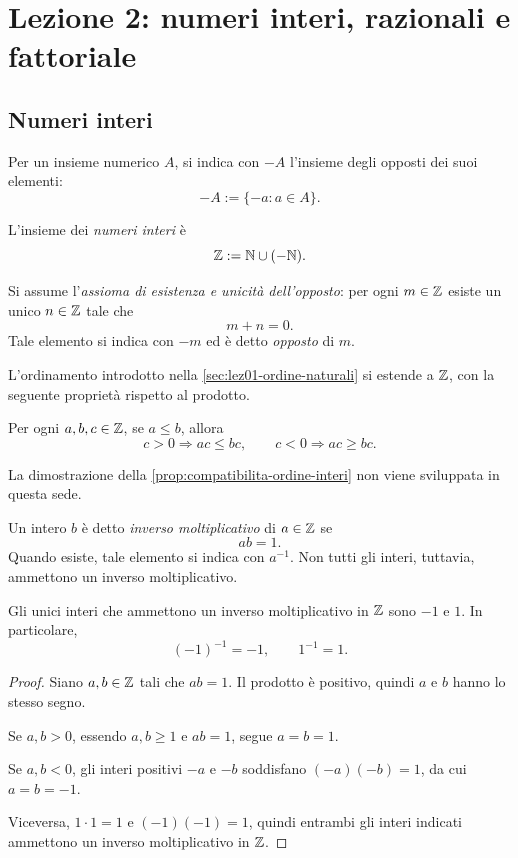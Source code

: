 \chapter[Lezione 2 --- 30 settembre 2026]{Lezione 2: numeri interi, razionali e fattoriale}
\label{chap:lezione-02}

\section{Numeri interi}
\label{sec:lez02-numeri-interi}

Per un insieme numerico \(A\), si indica con \(-A\) l'insieme degli
opposti dei suoi elementi:
\[
  -A:=\{-a:a\in A\}.
\]

\begin{definition}
\label{def:numeri-interi}
L'insieme dei \emph{numeri interi} è
\[
  \mathbb{Z}:=\mathbb{N}\cup(-\mathbb{N}).
\]
\end{definition}

Si assume l'\emph{assioma di esistenza e unicità dell'opposto}: per ogni
\(m\in\mathbb{Z}\) esiste un unico \(n\in\mathbb{Z}\) tale che
\[
  m+n=0.
\]
Tale elemento si indica con \(-m\) ed è detto \emph{opposto} di \(m\).

L'ordinamento introdotto nella \cref{sec:lez01-ordine-naturali}
si estende a \(\mathbb{Z}\), con la seguente proprietà rispetto al prodotto.

\begin{proposition}
\label{prop:compatibilita-ordine-interi}
Per ogni \(a,b,c\in\mathbb{Z}\), se \(a\le b\), allora
\[
  c>0\Longrightarrow ac\le bc,
  \qquad
  c<0\Longrightarrow ac\ge bc.
\]
\end{proposition}

La dimostrazione della \cref{prop:compatibilita-ordine-interi}
non viene sviluppata in questa sede.

Un intero \(b\) è detto \emph{inverso moltiplicativo} di
\(a\in\mathbb{Z}\) se
\[
  ab=1.
\]
Quando esiste, tale elemento si indica con \(a^{-1}\).
Non tutti gli interi, tuttavia, ammettono un inverso moltiplicativo.

\begin{proposition}
\label{prop:inversi-interi}
Gli unici interi che ammettono un inverso moltiplicativo in
\(\mathbb{Z}\) sono \(-1\) e \(1\). In particolare,
\[
  (-1)^{-1}=-1,
  \qquad
  1^{-1}=1.
\]
\end{proposition}

\begin{proof}
Siano \(a,b\in\mathbb{Z}\) tali che \(ab=1\). Il prodotto è positivo,
quindi \(a\) e \(b\) hanno lo stesso segno.

Se \(a,b>0\), essendo \(a,b\ge1\) e \(ab=1\), segue
\(a=b=1\).

Se \(a,b<0\), gli interi positivi \(-a\) e \(-b\)
soddisfano \((-a)(-b)=1\), da cui \(a=b=-1\).

Viceversa, \(1\cdot1=1\) e \((-1)(-1)=1\), quindi entrambi
gli interi indicati ammettono un inverso moltiplicativo in \(\mathbb{Z}\).
\end{proof}

